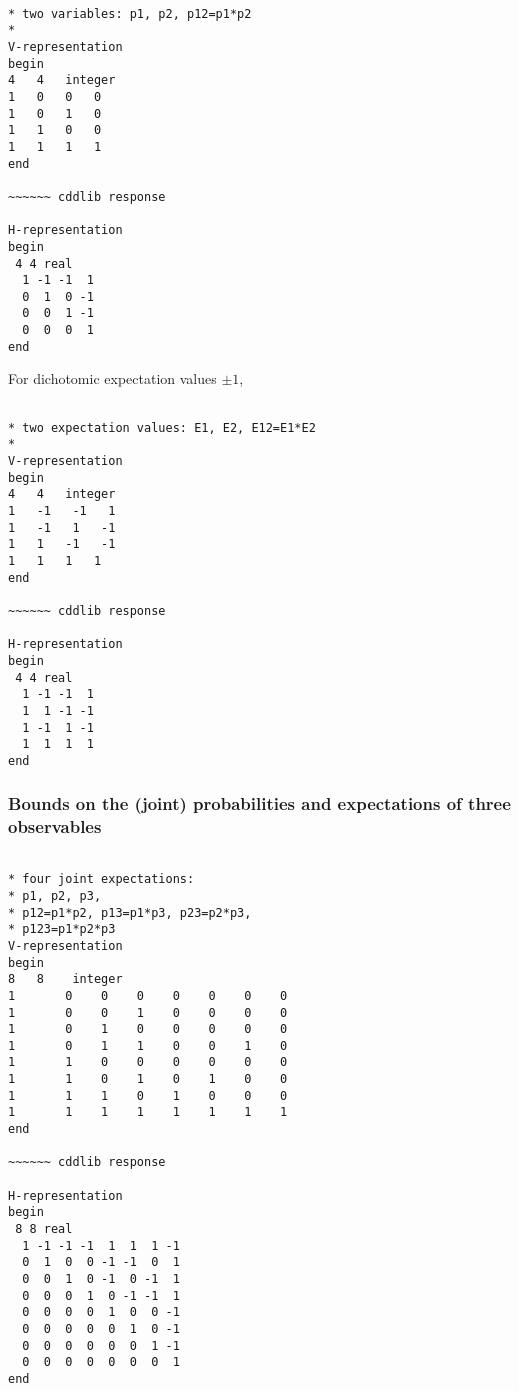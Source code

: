 \documentclass[%
 showpacs,
 showkeys,
 preprintnumbers,
 amsmath,amssymb,
 aps,
  pra,
  longbibliography,
 floatfix,
 ]{revtex4-1}
\begin{document}
{ \begin{lstlisting}[backgroundcolor=\color{yellow!10},framerule=0pt,breaklines=true, frame=tb]

* two variables: p1, p2, p12=p1*p2
*
V-representation
begin
4   4   integer
1   0   0   0
1   0   1   0
1   1   0   0
1   1   1   1
end

~~~~~~ cddlib response

H-representation
begin
 4 4 real
  1 -1 -1  1
  0  1  0 -1
  0  0  1 -1
  0  0  0  1
end

\end{lstlisting}  }

For dichotomic expectation values $\pm 1$,
{ \begin{lstlisting}[backgroundcolor=\color{yellow!10},framerule=0pt,breaklines=true, frame=tb]

* two expectation values: E1, E2, E12=E1*E2
*
V-representation
begin
4   4   integer
1   -1   -1   1
1   -1   1   -1
1   1   -1   -1
1   1   1   1
end

~~~~~~ cddlib response

H-representation
begin
 4 4 real
  1 -1 -1  1
  1  1 -1 -1
  1 -1  1 -1
  1  1  1  1
end

\end{lstlisting}  }

\subsubsection{Bounds on the (joint) probabilities and expectations of three observables}
\label{2017-b-tevoa}


{ \begin{lstlisting}[backgroundcolor=\color{yellow!10},framerule=0pt,breaklines=true, frame=tb]

* four joint expectations:
* p1, p2, p3,
* p12=p1*p2, p13=p1*p3, p23=p2*p3,
* p123=p1*p2*p3
V-representation
begin
8   8    integer
1       0    0    0    0    0    0    0
1       0    0    1    0    0    0    0
1       0    1    0    0    0    0    0
1       0    1    1    0    0    1    0
1       1    0    0    0    0    0    0
1       1    0    1    0    1    0    0
1       1    1    0    1    0    0    0
1       1    1    1    1    1    1    1
end

~~~~~~ cddlib response

H-representation
begin
 8 8 real
  1 -1 -1 -1  1  1  1 -1
  0  1  0  0 -1 -1  0  1
  0  0  1  0 -1  0 -1  1
  0  0  0  1  0 -1 -1  1
  0  0  0  0  1  0  0 -1
  0  0  0  0  0  1  0 -1
  0  0  0  0  0  0  1 -1
  0  0  0  0  0  0  0  1
end

\end{lstlisting}  }
\end{document}
